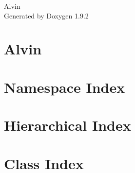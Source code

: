 \documentclass[twoside]{book}
\newcommand{\+}{\discretionary{\mbox{\scriptsize$\hookleftarrow$}}{}{}}
\newcommand{\clearemptydoublepage}{%
    \newpage{\pagestyle{empty}\cleardoublepage}%
  }
\begin{document}
  \raggedbottom
    \hypersetup{pageanchor=false,
                bookmarksnumbered=true,
                pdfencoding=unicode
               }
  \begin{titlepage}
  \vspace*{7cm}
  \begin{center}%
  {\Large Alvin}\\
  \vspace*{1cm}
  {\large Generated by Doxygen 1.9.2}\\
  \end{center}
  \end{titlepage}
  \clearemptydoublepage
  \tableofcontents
  \clearemptydoublepage
  \hypersetup{pageanchor=true}
\chapter{Alvin}
\label{index}\hypertarget{index}{}
\chapter{Namespace Index}

\chapter{Hierarchical Index}

\chapter{Class Index}

\end{document}
